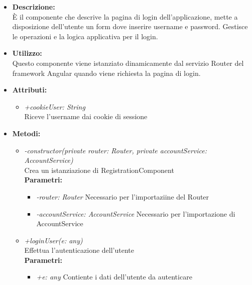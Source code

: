 \begin{itemize}
	\item \textbf{Descrizione:}\\
	È il componente che descrive la pagina di login dell’applicazione, mette a disposizione dell’utente un form dove inserire username e password. Gestisce le operazioni e la logica applicativa per il login.
	\item \textbf{Utilizzo:}\\
	Questo componente viene istanziato dinamicamente dal servizio Router del framework Angular quando viene richiesta la pagina di login.
	\item \textbf{Attributi:}
		\begin{itemize}
			\item \emph{+cookieUser: String}\\
			Riceve l'username dai cookie di sessione
		\end{itemize}
	\item \textbf{Metodi:}
		\begin{itemize}
			\item \emph{-constructor(private router: Router, private accountService: AccountService)}\\
    		Crea un istanziazione di RegistrationComponent\\
    		\textbf{Parametri:}
    		\begin{itemize}
    			\item \emph{-router: Router}
    			Necessario per l'importaziine del Router
    			\item \emph{-accountService: AccountService}
    			Necessario per l'importazione di AccountService
    		\end{itemize}
    		\item \emph{+loginUser(e: any)}\\
    		Effettua l'autenticazione dell'utente\\
    		\textbf{Parametri:}
    		\begin{itemize}
    			\item \emph{+e: any}
    			Contiente i dati dell'utente da autenticare
    		\end{itemize}
		\end{itemize}
\end{itemize}